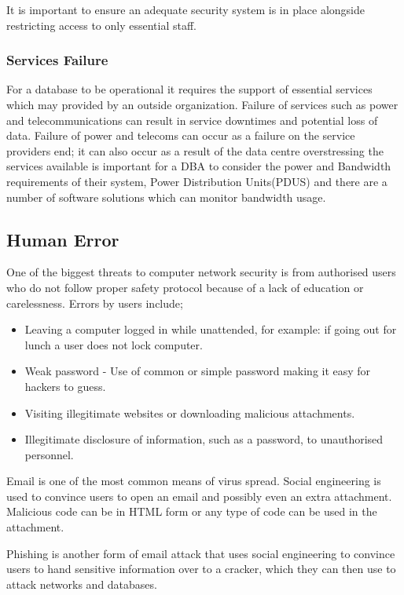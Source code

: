 \documentclass[11pt]{article}
\begin{document}
It is important to ensure an adequate security system is in place alongside restricting access to only essential staff.


\subsubsection{Services Failure}
For a database to be operational it requires the support of essential services which may provided by an outside organization.  Failure of services such as power and telecommunications can result in service downtimes and potential loss of data.  Failure of power and telecoms can occur as a failure on the service providers end; it can also occur as a result of the data centre overstressing the services available is important for a DBA to consider the power and Bandwidth requirements of their system, Power Distribution Units(PDUS) and there are a number of software solutions which can monitor bandwidth usage.


\subsection{Human Error}
One of the biggest threats to computer network security is from authorised users who do not follow proper safety protocol because of a lack of education or carelessness.  Errors by users include;

\begin{itemize}
\item Leaving a computer logged in while unattended, for example: if going out for lunch a user does not lock computer.
\item Weak password - Use of common or simple password making it easy for hackers to guess.
\item Visiting illegitimate websites or downloading malicious attachments.
\item Illegitimate disclosure of information, such as a password, to unauthorised personnel.
\end{itemize}

Email is one of the most common means of virus spread.  Social engineering is used to convince users to open an email and possibly even an extra attachment.  Malicious code can be in HTML form or any type of code can be used in the attachment.

Phishing is another form of email attack that uses social engineering to convince users to hand sensitive information over to a cracker, which they can then use to attack networks and databases.
\end{document}
